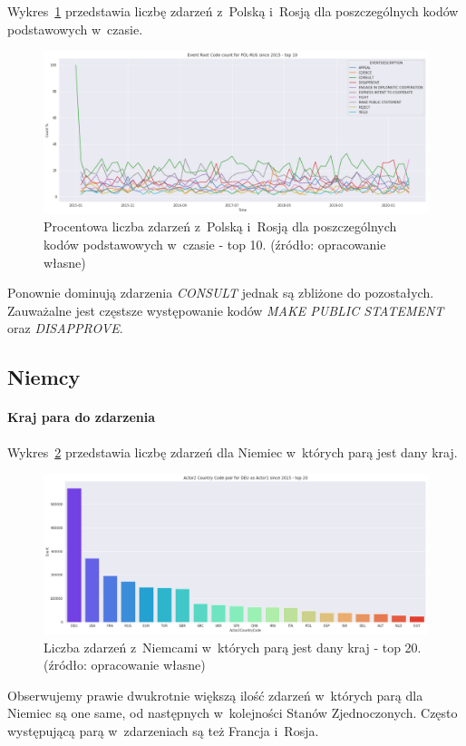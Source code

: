 \documentclass[11pt]{report}
\begin{document}
    Wykres~\ref{fig:PLRUSERC} przedstawia liczbę zdarzeń z~Polską i~Rosją dla poszczególnych kodów podstawowych w~czasie.
    \begin{figure}[!htp]
        \centering
        \includegraphics[width=\linewidth]{fig/PL/POLRUSERCperc.png}
        \caption{Procentowa liczba zdarzeń z~Polską i~Rosją dla poszczególnych kodów podstawowych w~czasie - top 10. (źródło: opracowanie własne)}
        \label{fig:PLRUSERC}
    \end{figure}
    Ponownie dominują zdarzenia \textit{CONSULT} jednak są zbliżone do pozostałych.
    Zauważalne jest częstsze występowanie kodów \textit{MAKE PUBLIC STATEMENT} oraz \textit{DISAPPROVE}.

    \subsection{Niemcy}

    \paragraph{Kraj para do zdarzenia}

    Wykres~\ref{fig:DEUpair} przedstawia liczbę zdarzeń dla Niemiec w~których parą jest dany kraj.
    \begin{figure}[!htp]
        \centering
        \includegraphics[width=\linewidth]{fig/DEU/DEUactor2Pair.png}
        \caption{Liczba zdarzeń z~Niemcami w~których parą jest dany kraj - top 20. (źródło: opracowanie własne)}
        \label{fig:DEUpair}
    \end{figure}
    Obserwujemy prawie dwukrotnie większą ilość zdarzeń w~których parą dla Niemiec są one same, od następnych w~kolejności Stanów Zjednoczonych.
    Często występującą parą w~zdarzeniach są też Francja i~Rosja.
\end{document}
